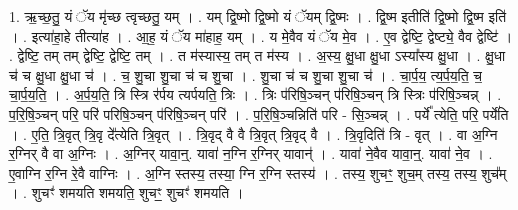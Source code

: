 \documentclass[17pt]{extarticle}
\begin{document}
1. ऋ॒च्छ॒तु॒ यं ॅय मृ॑च्छ त्वृच्छतु॒ यम् । . यम् द्वि॒ष्मो द्वि॒ष्मो यं ॅयम् द्वि॒ष्मः । . द्वि॒ष्म इतीति॑ द्वि॒ष्मो द्वि॒ष्म इति॑ । . इत्या॑हा॒हे तीत्या॑ह । . आ॒ह॒ यं ॅय मा॑हाह॒ यम् । . य मे॒वैव यं ॅय मे॒व । . ए॒व द्वेष्टि॒ द्वेष्ट्ये॒ वैव द्वेष्टि॑ । . द्वेष्टि॒ तम् तम् द्वेष्टि॒ द्वेष्टि॒ तम् । . त म॑स्यास्य॒ तम् त म॑स्य । . अ॒स्य॒ क्षु॒धा क्षु॒धा ऽस्या᳚स्य क्षु॒धा । . क्षु॒धा च॑ च क्षु॒धा क्षु॒धा च॑ । . च॒ शु॒चा शु॒चा च॑ च शु॒चा । . शु॒चा च॑ च शु॒चा शु॒चा च॑ । . चा॒र्प॒य॒ त्य॒र्प॒य॒ति॒ च॒ चा॒र्प॒य॒ति॒ । . अ॒र्प॒य॒ति॒ त्रि स्त्रि र॑र्पय त्यर्पयति॒ त्रिः । . त्रिः प॑रिषि॒ञ्चन् प॑रिषि॒ञ्चन् त्रि स्त्रिः प॑रिषि॒ञ्चन्न् । . प॒रि॒षि॒ञ्चन् परि॒ परि॑ परिषि॒ञ्चन् प॑रिषि॒ञ्चन् परि॑ । . प॒रि॒षि॒ञ्चन्निति॑ परि - सि॒ञ्चन्न् । . पर्ये᳚ त्येति॒ परि॒ पर्ये॑ति । . ए॒ति॒ त्रि॒वृत् त्रि॒वृ दे᳚त्येति त्रि॒वृत् । . त्रि॒वृद् वै वै त्रि॒वृत् त्रि॒वृद् वै । . त्रि॒वृदिति॑ त्रि - वृत् । . वा अ॒ग्नि र॒ग्निर् वै वा अ॒ग्निः । . अ॒ग्निर् यावा॒न्॒. यावा॑ न॒ग्नि र॒ग्निर् यावान्॑ । . यावा॑ ने॒वैव यावा॒न्॒. यावा॑ ने॒व । . ए॒वाग्नि र॒ग्नि रे॒वै वाग्निः । . अ॒ग्नि स्तस्य॒ तस्या॒ ग्नि र॒ग्नि स्तस्य॑ । . तस्य॒ शुचꣳ॒॒ शुच॒म् तस्य॒ तस्य॒ शुच᳚म् । . शुचꣳ॑ शमयति शमयति॒ शुचꣳ॒॒ शुचꣳ॑ शमयति । \newline
\end{document}

